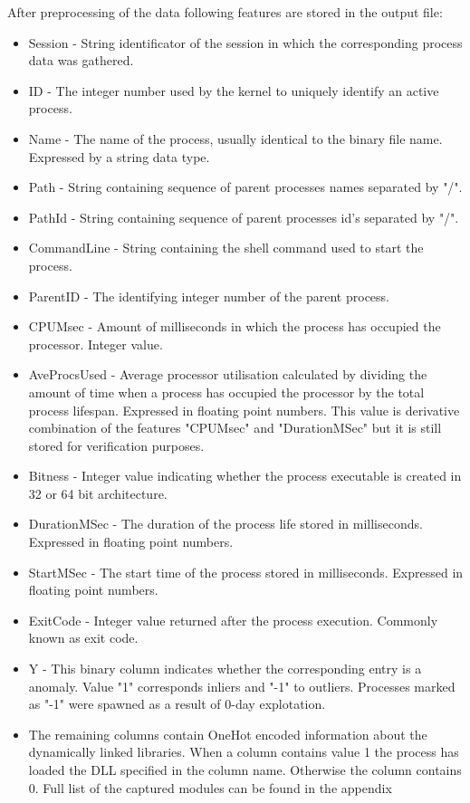 \documentclass[a4paper,twoside,12pt]{book}
\begin{document}
After preprocessing of the data following features are stored in the output file:
\begin{itemize}
	\item Session - String identificator of the session in which the corresponding process data 
	was gathered.
	\item ID -  The integer number used by the kernel to uniquely identify an active process.
	\item Name -  The name of the process, usually identical to the binary file name. Expressed by a 
	string data type.
	\item Path - String containing sequence of parent processes names separated by "/".
	\item PathId - String containing sequence of parent processes id's separated by "/".
	\item CommandLine - String containing the shell command used to start the process.
	\item ParentID - The identifying integer number of the parent process. 
	\item CPUMsec - Amount of milliseconds in which the process has occupied the processor. Integer value.
	\item AveProcsUsed -  Average processor utilisation calculated by dividing the amount of time 
	when a process has occupied the processor by the total process lifespan. Expressed in floating 
	point numbers. This value is derivative combination of the features "CPUMsec" and "DurationMSec"
	but it is still stored for verification purposes.
	\item Bitness - Integer value indicating whether the process executable is created in 
	32 or 64 bit architecture.
	\item DurationMSec - The duration of the process life stored in milliseconds. Expressed in 
	floating point numbers.
	\item StartMSec -  The start time of the process stored in milliseconds. Expressed in floating 
	point numbers.
	\item ExitCode - Integer value returned after the process execution. Commonly known as exit code.
	\item Y - This binary column indicates whether the corresponding entry is a anomaly. Value "1" corresponds
	inliers and "-1" to outliers. Processes marked as "-1" were spawned as a result of 0-day explotation.
	\item The remaining columns contain OneHot encoded information about the dynamically linked 
	libraries. When a column contains value 1 the process has loaded the DLL specified in the 
	column name. Otherwise the column contains 0. Full list of the captured modules can be 
	found in the appendix %
\end{itemize}
\end{document}
